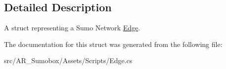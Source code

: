 \subsection{Detailed Description}
A struct representing a Sumo Network \mbox{\hyperlink{class_edge}{Edge}}. 



The documentation for this struct was generated from the following file\+:\begin{DoxyCompactItemize}
\item 
src/\+A\+R\+\_\+\+Sumobox/\+Assets/\+Scripts/Edge.\+cs\end{DoxyCompactItemize}
